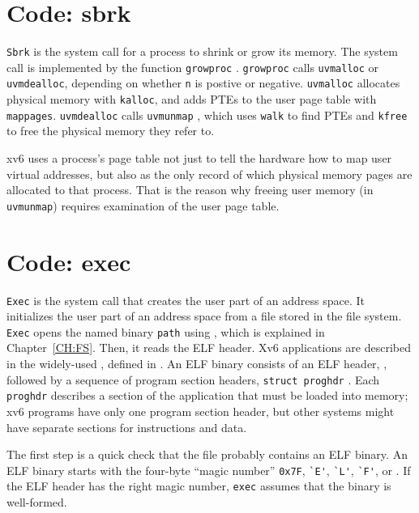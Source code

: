 \section{Code: sbrk}

\lstinline{Sbrk}
is the system call for a process to shrink or grow its memory. The system
call is implemented by the function
\lstinline{growproc}
.
\lstinline{growproc} calls \lstinline{uvmalloc} or
\lstinline{uvmdealloc}, depending on whether \lstinline{n} is postive
or negative.
\lstinline{uvmalloc}
allocates physical memory with {\tt kalloc},
and adds PTEs to the user page table with {\tt mappages}.
\lstinline{uvmdealloc} calls
{\tt uvmunmap}
,
which uses {\tt walk} to find PTEs and
{\tt kfree} to free the physical memory they refer to.

xv6 uses a process's page table not just to tell the hardware how to
map user virtual addresses, but also as the only record of which
physical memory pages are allocated to that process. That is the
reason why freeing user memory (in {\tt uvmunmap}) requires
examination of the user page table.

\section{Code: exec}
\lstinline{Exec}
is the system call that creates the user part of an address space.  It
initializes the user part of an address space from a file stored in the file
system.
\lstinline{Exec}
opens the named binary
\lstinline{path}
using
,
which is explained in Chapter~\ref{CH:FS}.
Then, it reads the ELF header. Xv6 applications are described in the widely-used
,
defined in
.
An ELF binary consists of an ELF header,
,
followed by a sequence of program section headers,
\lstinline{struct proghdr}
.
Each
\lstinline{proghdr}
describes a section of the application that must be loaded into memory;
xv6 programs have only one program section header, but
other systems might have separate sections
for instructions and data.

The first step is a quick check that the file probably contains an
ELF binary.
An ELF binary starts with the four-byte ``magic number''
\lstinline{0x7F},
\lstinline{`E'},
\lstinline{`L'},
\lstinline{`F'},
or
.
If the ELF header has the right magic number,
\lstinline{exec}
assumes that the binary is well-formed.

